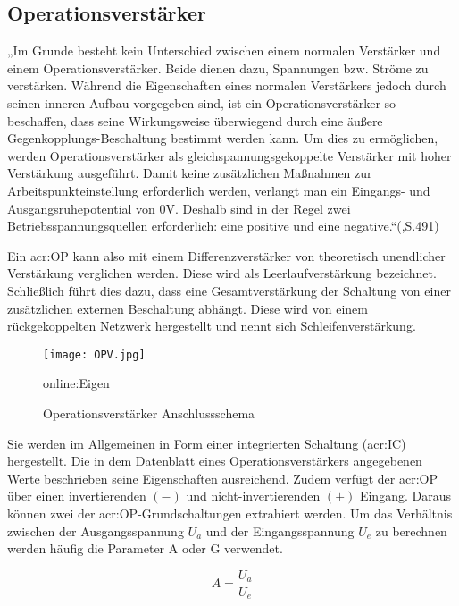 \subsection{Operationsverstärker}
\label{subsec:OP}

„Im Grunde besteht kein Unterschied zwischen einem normalen Verstärker und einem Operationsverstärker. Beide dienen dazu, Spannungen bzw. Ströme zu verstärken. Während die Eigenschaften eines normalen Verstärkers jedoch durch seinen inneren Aufbau vorgegeben sind, ist ein Operationsverstärker so beschaffen, dass seine Wirkungsweise überwiegend durch eine äußere Gegenkopplungs-Beschaltung bestimmt werden kann. Um dies zu ermöglichen, werden Operationsverstärker als gleichspannungsgekoppelte Verstärker mit hoher Verstärkung ausgeführt. Damit keine zusätzlichen Maßnahmen zur Arbeitspunkteinstellung erforderlich werden, verlangt man ein Eingangs- und Ausgangsruhepotential von 0V. Deshalb sind in der Regel zwei Betriebsspannungsquellen erforderlich: eine positive und eine negative.“(\cite{tietzeElectronicCircuits2008},S.491)

Ein \gls{acr:OP} kann also mit einem Differenzverstärker von theoretisch unendlicher Verstärkung verglichen werden. Diese wird als Leerlaufverstärkung bezeichnet. Schließlich führt dies dazu, dass eine Gesamtverstärkung der Schaltung von einer zusätzlichen externen Beschaltung abhängt. Diese wird von einem rückgekoppelten Netzwerk hergestellt und nennt sich Schleifenverstärkung.\cite{lutzHalbleiterLeistungsbauelemente2012}

\begin{figure}[H]
	\centering
	\texttt{[image: OPV.jpg]}
	\caption[Operationsverstärker Anschlussschema]{Operationsverstärker Anschlussschema} 
	\gls{online:Eigen}
	\label{fig:OPV}
\end{figure}

Sie werden im Allgemeinen in Form einer integrierten Schaltung (\gls{acr:IC}) hergestellt. Die in dem Datenblatt eines Operationsverstärkers angegebenen Werte beschrieben seine Eigenschaften ausreichend. Zudem verfügt der \gls{acr:OP} über einen invertierenden $(-)$ und nicht-invertierenden $(+)$ Eingang.\cite{OP} Daraus können zwei der \gls{acr:OP}-Grundschaltungen extrahiert werden. Um das Verhältnis zwischen der Ausgangsspannung $U_{a}$ und der Eingangsspannung $U_{e}$ zu berechnen werden häufig die Parameter A oder G verwendet.\cite{tietzeElectronicCircuits2008}

\begin{equation}
	\label{equ:bsp1}
	A = \frac{U_{a}}{U_{e}}
\end{equation}

